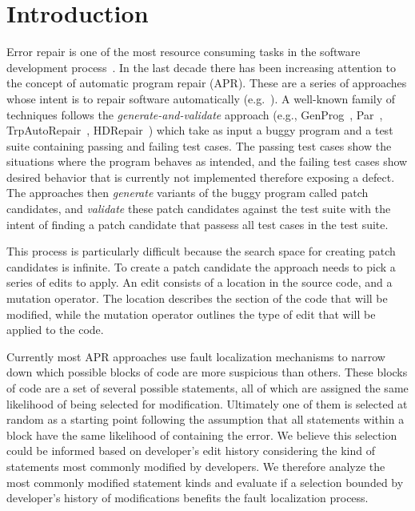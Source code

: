 \documentclass[sigconf]{acmart}
\begin{document}




\maketitle

\section{Introduction}
Error repair is one of the most resource consuming tasks in 
the software development process~\cite{Weiss07,Tassey02,Britton13}.
In the last decade there has been increasing attention to 
the concept of automatic program repair (APR). These are a 
series of approaches whose intent is to repair software
automatically (e.g.~\cite{legoues12,kim2013,Weimer13,long15SPR,long16proph,debroy10,perkins09,wei10}).
A well-known family of techniques follows the \emph{generate-and-validate}
approach (e.g., GenProg~\cite{legoues12}, 
Par~\cite{kim2013}, TrpAutoRepair~\cite{Qi13TrpAutoR}, HDRepair~\cite{xuan16}) 
which take as input a buggy program and a test suite containing
passing and failing test cases.
The passing test cases show the situations where the program  
behaves as intended, and the failing test cases show desired behavior
that is currently not implemented therefore exposing a defect.
The approaches then \emph{generate} variants of the buggy program
called patch candidates, and \emph{validate} these patch
candidates against the test suite with the intent of finding 
a patch candidate that passess all test cases in the test suite.

This process is particularly difficult because the search space
for creating patch candidates is infinite. To create a patch 
candidate the approach needs to pick a series of edits to apply.
An edit consists of a location in the source code,
and a mutation operator. The location describes the section
of the code that will be modified, while the mutation operator
outlines the type of edit that will be applied to the code.


Currently most APR approaches use fault localization mechanisms to 
narrow down which possible blocks of code are
more suspicious than others.  
These blocks of code are 
a set of several possible statements, all of which are assigned
the same likelihood of being selected for modification.
Ultimately one of them is selected at random as a starting point 
following the assumption that all statements within a block
have the same likelihood of containing the error.
We believe this selection could be informed based on developer's
edit history considering the kind of statements most commonly
modified by developers. We therefore analyze the most commonly 
modified statement kinds and evaluate if a selection 
bounded by developer's history of modifications benefits
the fault localization process.
\end{document}

